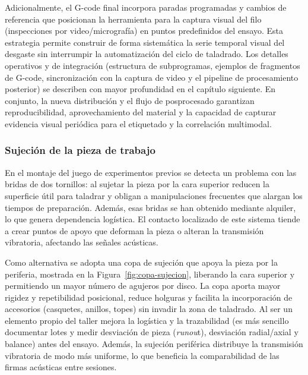 \documentclass[12pt, letterpaper]{report}
\begin{document}
Adicionalmente, el G-code final incorpora paradas programadas y cambios de referencia que posicionan la herramienta para la captura visual del filo (inspecciones por video/micrografía) en puntos predefinidos del ensayo. Esta estrategia permite construir de forma sistemática la serie temporal visual del desgaste sin interrumpir la automatización del ciclo de taladrado. Los detalles operativos y de integración (estructura de subprogramas, ejemplos de fragmentos de G-code, sincronización con la captura de video y el pipeline de procesamiento posterior) se describen con mayor profundidad en el capítulo siguiente. En conjunto, la nueva distribución y el flujo de posprocesado garantizan reproducibilidad, aprovechamiento del material y la capacidad de capturar evidencia visual periódica para el etiquetado y la correlación multimodal.

\subsubsection{Sujeción de la pieza de trabajo}

En el montaje del juego de experimentos previos  se detecta un problema con las bridas de dos tornillos: al sujetar la pieza por la cara superior reducen la superficie útil para taladrar y obligan a manipulaciones frecuentes que alargan los tiempos de preparación. Además, esas bridas se han obtenido mediante alquiler, lo que genera dependencia logística. El contacto localizado de este sistema tiende a crear puntos de apoyo que deforman la pieza o alteran la transmisión vibratoria, afectando las señales acústicas.


Como alternativa se adopta una copa de sujeción que apoya la pieza por la periferia, mostrada en la Figura~\ref{fig:copa-sujecion}, liberando la cara superior y permitiendo un mayor número de agujeros por disco. La copa aporta mayor rigidez y repetibilidad posicional, reduce holguras y facilita la incorporación de accesorios (casquetes, anillos, topes) sin invadir la zona de taladrado. Al ser un elemento propio del taller mejora la logística y la trazabilidad (es más sencillo documentar lotes y medir desviación de pieza (\textit{runou}t), desviación radial/axial y balance) antes del ensayo. Además, la sujeción periférica distribuye la transmisión vibratoria de modo más uniforme, lo que beneficia la comparabilidad de las firmas acústicas entre sesiones.
\end{document}
